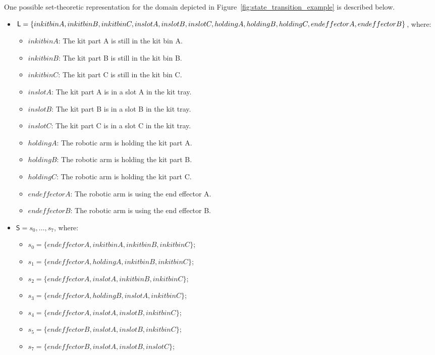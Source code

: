 One possible set-theoretic representation for the domain depicted in Figure~\ref{fig:state_transition_example} is described below.
\begin{itemize}
\item $\mathsf{L} = \lbrace inkitbinA,inkitbinB,inkitbinC,inslotA,inslotB,inslotC,\\holdingA,holdingB,holdingC,endeffectorA,endeffectorB\rbrace$, where:
\begin{itemize}
\item $inkitbinA$: The kit part A is still in the kit bin A.
\item $inkitbinB$: The kit part B is still in the kit bin B.
\item $inkitbinC$: The kit part C is still in the kit bin C.
\item $inslotA$: The kit part A is in a slot A in the kit tray.
\item $inslotB$: The kit part B is in a slot B in the kit tray.
\item $inslotC$: The kit part C is in a slot C in the kit tray.
\item $holdingA$: The robotic arm is holding the kit part A.
\item $holdingB$: The robotic arm is holding the kit part B.
\item $holdingC$: The robotic arm is holding the kit part C.
\item $endeffectorA$: The robotic arm is using the end effector A.
\item $endeffectorB$: The robotic arm is using the end effector B.
\end{itemize}
\item $\mathsf{S}={s_0,\dots,s_7}$, where:
\begin{itemize}
\item $s_0=\lbrace endeffectorA,inkitbinA,inkitbinB,inkitbinC\rbrace$;
\item $s_1=\lbrace endeffectorA,holdingA,inkitbinB,inkitbinC\rbrace$;
\item $s_2=\lbrace endeffectorA,inslotA,inkitbinB,inkitbinC \rbrace$;
\item $s_3=\lbrace endeffectorA,holdingB,inslotA,inkitbinC\rbrace$;
\item $s_4=\lbrace endeffectorA,inslotA,inslotB,inkitbinC\rbrace$;
\item $s_5=\lbrace endeffectorB,inslotA,inslotB,inkitbinC\rbrace$;
\item $s_7=\lbrace endeffectorB,inslotA,inslotB,inslotC\rbrace$;
\end{itemize}

\end{itemize}
